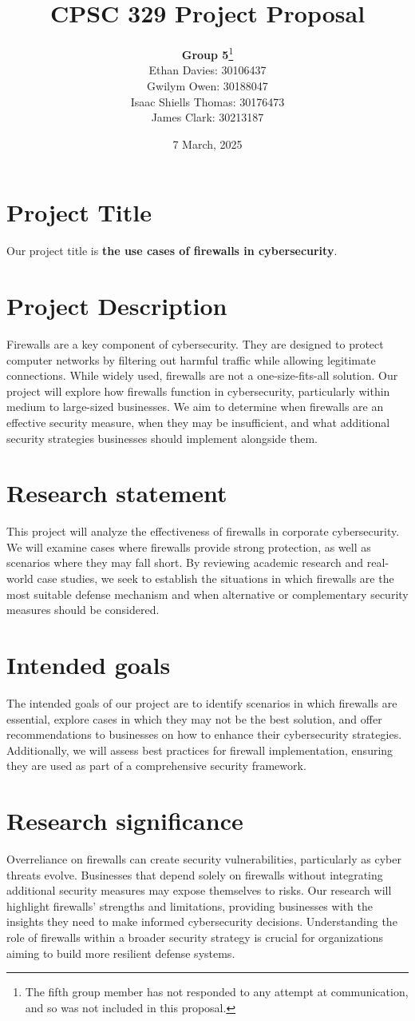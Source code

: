 \documentclass{article}
\title{CPSC 329 Project Proposal}
\author{\textbf{Group 5}\footnote{The fifth group member has not responded to any attempt at communication, and so was not included in this proposal.} \\ Ethan Davies: 30106437 \\ Gwilym Owen: 30188047\\ Isaac Shiells Thomas: 30176473 \\ James Clark: 30213187}
\date{7 March, 2025}
\begin{document}
\maketitle
\section*{Project Title}
Our project title is \textbf{the use cases of firewalls in cybersecurity}.

\section{Project Description}
Firewalls are a key component of cybersecurity. They are designed to protect computer networks by filtering out harmful traffic while allowing legitimate connections. While widely used, firewalls are not a one-size-fits-all solution. Our project will explore how firewalls function in cybersecurity, particularly within medium to large-sized businesses. We aim to determine when firewalls are an effective security measure, when they may be insufficient, and what additional security strategies businesses should implement alongside them.	

\section{Research statement}
This project will analyze the effectiveness of firewalls in corporate cybersecurity. We will examine cases where firewalls provide strong protection, as well as scenarios where they may fall short. By reviewing academic research and real-world case studies, we seek to establish the situations in which firewalls are the most suitable defense mechanism and when alternative or complementary security measures should be considered.

\section{Intended goals}
The intended goals of our project are to identify scenarios in which firewalls are essential, explore cases in which they may not be the best solution, and offer recommendations to businesses on how to enhance their cybersecurity strategies. Additionally, we will assess best practices for firewall implementation, ensuring they are used as part of a comprehensive security framework.

\section{Research significance}
Overreliance on firewalls can create security vulnerabilities, particularly as cyber threats evolve. Businesses that depend solely on firewalls without integrating additional security measures may expose themselves to risks. Our research will highlight firewalls' strengths and limitations, providing businesses with the insights they need to make informed cybersecurity decisions. Understanding the role of firewalls within a broader security strategy is crucial for organizations aiming to build more resilient defense systems.
\end{document}
